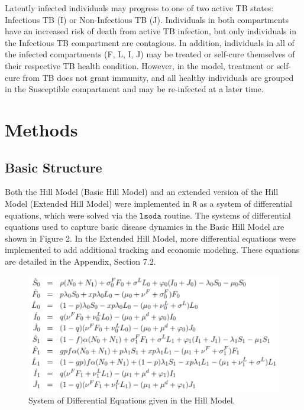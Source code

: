 \documentclass{amsart}
\begin{document}
Latently infected individuals may progress to one of two active TB states: Infectious TB (I) or 
Non-Infectious TB (J).  Individuals in both compartments have an increased risk of death from
active TB infection, but only individuals in the Infectious TB compartment are contagious.  
In addition, individuals in all of the infected compartments (F, L, I, J) may be treated or self-cure
themselves of their respective TB health condition.  However, in the model, treatment or self-cure from TB
does not grant immunity, and all healthy individuals are grouped in the Susceptible compartment
and may be re-infected at a later time.  \\

\section{Methods}
\subsection{Basic Structure}
Both the Hill Model (Basic Hill Model) and an extended version of the Hill Model (Extended Hill 
Model) were implemented in 
\texttt{R} as a system of differential equations, which were solved via the
$\texttt{lsoda}$ routine. The systems of differential equations used to capture basic disease dynamics in the Basic Hill Model are shown in Figure 2. In the Extended Hill Model,
more differential equations were implemented to add additional tracking and
economic modeling. These equations are detailed in the Appendix, Section 7.2. 

\begin{figure}
  \begin{center}
    \includegraphics[scale=0.75]{figures/BasicHillEquations.pdf}
  \end{center}
  \caption{System of Differential Equations given in the Hill Model.}
  \label{fig:hillEquations}
\end{figure}
\end{document}
